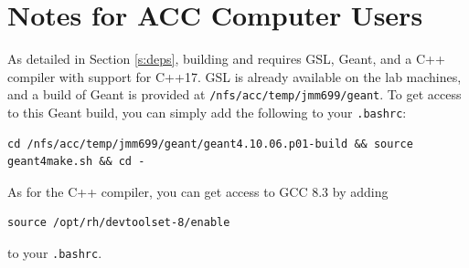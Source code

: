 \documentclass[12pt]{article}
\begin{document}
\appendix

\section{Notes for ACC Computer Users}

As detailed in Section \ref{s:deps}, building \exes and \exef requires GSL, Geant, and a C++ compiler with support for C++17.
GSL is already available on the lab machines, and a build of Geant is provided at \texttt{/nfs/acc/temp/jmm699/geant}.
To get access to this Geant build, you can simply add the following to your \texttt{.bashrc}:
\begin{verbatim}
cd /nfs/acc/temp/jmm699/geant/geant4.10.06.p01-build && source geant4make.sh && cd -
\end{verbatim}
As for the C++ compiler, you can get access to GCC 8.3 by adding
\begin{verbatim}
source /opt/rh/devtoolset-8/enable
\end{verbatim}
to your \texttt{.bashrc}.








\printbibliography
\end{document}
